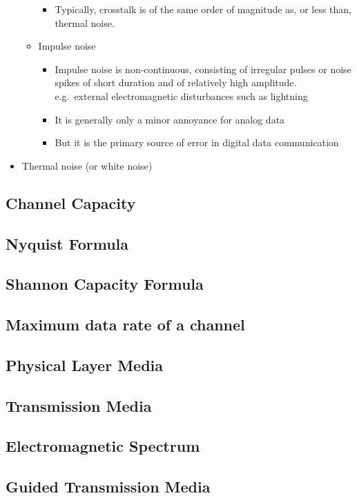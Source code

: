 \documentclass[11pt]{article}
\begin{document}
\begin{itemize}
\begin{itemize}
\begin{itemize}
            \item Typically, crosstalk is of the same order of magnitude as, or less than, thermal noise.
        \end{itemize}
        \item Impulse noise
        \begin{itemize}
            \item Impulse noise is non-continuous, consisting of irregular pulses or noise spikes of short duration and of relatively high amplitude. \\
            e.g.\ external electromagnetic disturbances such as lightning         
            \item It is generally only a minor annoyance for analog data 
            \item But it is the primary source of error in digital data communication  
        \end{itemize}
    \end{itemize}
    \item Thermal noise (or white noise)
\end{itemize}
\subsection{Channel Capacity}
\subsection{Nyquist Formula}
\subsection{Shannon Capacity Formula}
\subsection{Maximum data rate of a channel}
\subsection{Physical Layer Media}
\subsection{Transmission Media}
\subsection{Electromagnetic Spectrum}
\subsection{Guided Transmission Media}
\end{document}
